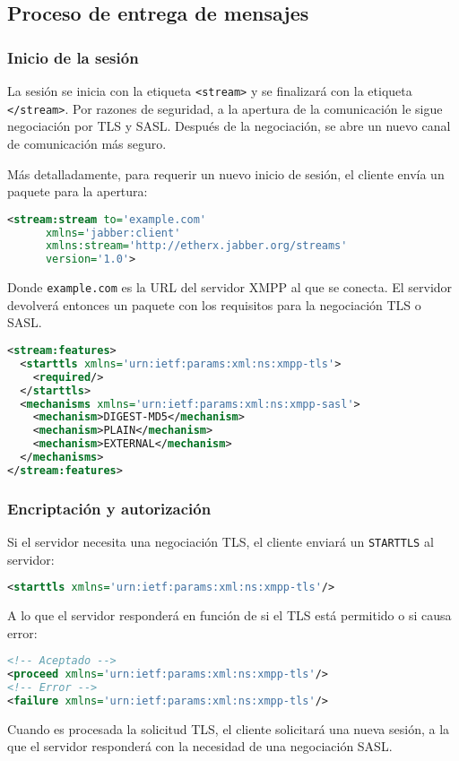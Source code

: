 \documentclass[a4paper, 11pt]{article} %
\begin{document}
  \subsection{Proceso de entrega de mensajes}
    \subsubsection{Inicio de la sesión}
      La sesión se inicia con la etiqueta \texttt{<stream>} y se finalizará con la etiqueta
      \texttt{</stream>}. Por razones de seguridad, a la apertura de la comunicación le sigue
      negociación por TLS y SASL. Después de la negociación, se abre un nuevo canal de comunicación
      más seguro.
      
      Más detalladamente, para requerir un nuevo inicio de sesión, el cliente envía un paquete para la apertura:
      \begin{lstlisting}[language=XML] 
<stream:stream to='example.com' 
	  xmlns='jabber:client'
	  xmlns:stream='http://etherx.jabber.org/streams'
	  version='1.0'>
      \end{lstlisting}
      Donde \texttt{example.com} es la URL del servidor XMPP al que se conecta. El servidor
      devolverá entonces un paquete con los requisitos para la negociación TLS o SASL.
      \begin{lstlisting}[language=XML]
<stream:features> 
  <starttls xmlns='urn:ietf:params:xml:ns:xmpp-tls'>    
    <required/>  
  </starttls>  
  <mechanisms xmlns='urn:ietf:params:xml:ns:xmpp-sasl'>    
    <mechanism>DIGEST-MD5</mechanism>    
    <mechanism>PLAIN</mechanism>   
    <mechanism>EXTERNAL</mechanism>  
  </mechanisms> 
</stream:features>
      \end{lstlisting}

  \subsubsection{Encriptación y autorización}
    Si el servidor necesita una negociación TLS, el cliente enviará un \texttt{STARTTLS} al servidor:
    \begin{lstlisting}[language=XML]
<starttls xmlns='urn:ietf:params:xml:ns:xmpp-tls'/>    
    \end{lstlisting}
    A lo que el servidor responderá en función de si el TLS está permitido o si causa error:
    \begin{lstlisting}[language=XML]
<!-- Aceptado -->
<proceed xmlns='urn:ietf:params:xml:ns:xmpp-tls'/> 
<!-- Error -->
<failure xmlns='urn:ietf:params:xml:ns:xmpp-tls'/> 
    \end{lstlisting}
    Cuando es procesada la solicitud TLS, el cliente solicitará una nueva sesión, a la que el servidor
    responderá con la necesidad de una negociación SASL.
\end{document}
